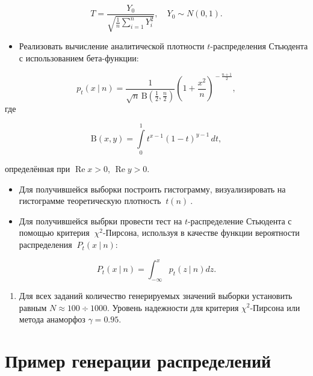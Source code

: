 \documentclass[
]{article}
\providecommand{\tightlist}{%
  \setlength{\itemsep}{0pt}\setlength{\parskip}{0pt}}
\begin{document}
\[
T = \frac{Y_0}{\sqrt{\frac{1}{n} \sum_{i=1}^{n} Y_i^2}}, \quad Y_0 \sim N(0, 1).
\]

\begin{itemize}
\tightlist
\item
  Реализовать вычисление аналитической плотности \(t\)-распределения
  Стьюдента с использованием бета-функции:
\end{itemize}

\[
{\displaystyle p_{t}(x\ |\ n)={\frac {1}{{\sqrt {n}}\,\mathrm {B} ({\frac {1}{2}},{\frac {n}{2}})}}\left(1+{\frac {x^{2}}{n}}\right)^{\!-{\frac {n+1}{2}}}},
\] где

\[
{\displaystyle \mathrm {B} (x,y)=\int \limits _{0}^{1}t^{x-1}(1-t)^{y-1}\,dt,}
\]

определённая при \({\displaystyle \operatorname {Re} x>0}\),
\({\displaystyle \operatorname {Re} y>0}\).

\begin{itemize}
\item
  Для получившейся выборки построить гистограмму, визуализировать на
  гистограмме теоретическую плотность \(\ t(n)\ \).
\item
  Для получившейся выбрки провести тест на \(t\)-распределение Стьюдента
  с помощью критерия \(\ \chi^2\)-Пирсона, используя в качестве функции
  вероятности распределения \(\ P_t(x\ |\ n)\):
\end{itemize}

\[
P_t(x\ |\ n) = \int_{-\infty}^{x} p_t(z\ |\ n) dz.
\]

\begin{enumerate}
\def\labelenumi{\arabic{enumi}.}
\setcounter{enumi}{4}
\tightlist
\item
  Для всех заданий количество генерируемых значений выборки установить
  равным \(N \approx 100 \div 1000\). Уровень надежности для критерия
  \(\chi^2\)-Пирсона или метода анаморфоз \(\gamma = 0.95\).
\end{enumerate}

\hypertarget{ux43fux440ux438ux43cux435ux440-ux433ux435ux43dux435ux440ux430ux446ux438ux438-ux440ux430ux441ux43fux440ux435ux434ux435ux43bux435ux43dux438ux439}{%
\section{\texorpdfstring{\textbf{Пример генерации
распределений}}{Пример генерации распределений}}\label{ux43fux440ux438ux43cux435ux440-ux433ux435ux43dux435ux440ux430ux446ux438ux438-ux440ux430ux441ux43fux440ux435ux434ux435ux43bux435ux43dux438ux439}}
\end{document}
